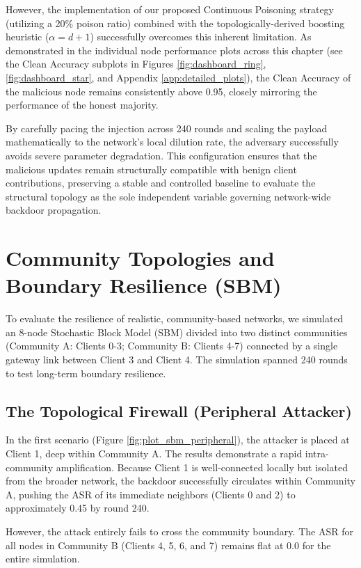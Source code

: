 However, the implementation of our proposed Continuous Poisoning strategy (utilizing a 20\% poison ratio) combined with the topologically-derived boosting heuristic ($\alpha=d+1$) successfully overcomes this inherent limitation. As demonstrated in the individual node performance plots across this chapter (see the Clean Accuracy subplots in Figures \ref{fig:dashboard_ring}, \ref{fig:dashboard_star}, and Appendix \ref{app:detailed_plots}), the Clean Accuracy of the malicious node remains consistently above 0.95, closely mirroring the performance of the honest majority. 

By carefully pacing the injection across 240 rounds and scaling the payload mathematically to the network's local dilution rate, the adversary successfully avoids severe parameter degradation. This configuration ensures that the malicious updates remain structurally compatible with benign client contributions, preserving a stable and controlled baseline to evaluate the structural topology as the sole independent variable governing network-wide backdoor propagation.

\section{Community Topologies and Boundary Resilience (SBM)}
To evaluate the resilience of realistic, community-based networks, we simulated an 8-node Stochastic Block Model (SBM) divided into two distinct communities (Community A: Clients 0-3; Community B: Clients 4-7) connected by a single gateway link between Client 3 and Client 4. The simulation spanned 240 rounds to test long-term boundary resilience.

\subsection{The Topological Firewall (Peripheral Attacker)}
In the first scenario (Figure \ref{fig:plot_sbm_peripheral}), the attacker is placed at Client 1, deep within Community A. The results demonstrate a rapid intra-community amplification. Because Client 1 is well-connected locally but isolated from the broader network, the backdoor successfully circulates within Community A, pushing the ASR of its immediate neighbors (Clients 0 and 2) to approximately 0.45 by round 240. 

However, the attack entirely fails to cross the community boundary. The ASR for all nodes in Community B (Clients 4, 5, 6, and 7) remains flat at 0.0 for the entire simulation. 

